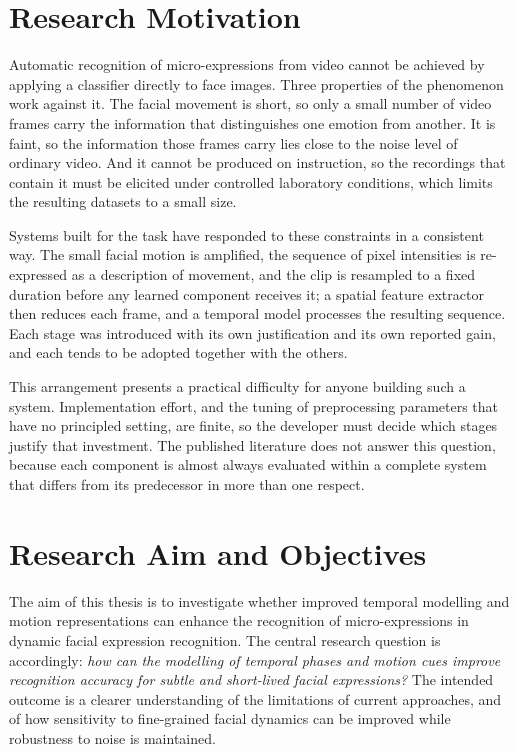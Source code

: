 \section{Research Motivation}
\label{sec:motivation}

Automatic recognition of micro-expressions from video cannot be achieved by applying a classifier directly to face images. Three properties of the phenomenon work against it. The facial movement is short, so only a small number of video frames carry the information that distinguishes one emotion from another. It is faint, so the information those frames carry lies close to the noise level of ordinary video. And it cannot be produced on instruction, so the recordings that contain it must be elicited under controlled laboratory conditions, which limits the resulting datasets to a small size.

Systems built for the task have responded to these constraints in a consistent way. The small facial motion is amplified, the sequence of pixel intensities is re-expressed as a description of movement, and the clip is resampled to a fixed duration before any learned component receives it; a spatial feature extractor then reduces each frame, and a temporal model processes the resulting sequence. Each stage was introduced with its own justification and its own reported gain, and each tends to be adopted together with the others.

This arrangement presents a practical difficulty for anyone building such a system. Implementation effort, and the tuning of preprocessing parameters that have no principled setting, are finite, so the developer must decide which stages justify that investment. The published literature does not answer this question, because each component is almost always evaluated within a complete system that differs from its predecessor in more than one respect.


\section{Research Aim and Objectives}
\label{sec:objectives}

The aim of this thesis is to investigate whether improved temporal modelling and motion representations can enhance the recognition of micro-expressions in dynamic facial expression recognition. The central research question is accordingly: \textit{how can the modelling of temporal phases and motion cues improve recognition accuracy for subtle and short-lived facial expressions?} The intended outcome is a clearer understanding of the limitations of current approaches, and of how sensitivity to fine-grained facial dynamics can be improved while robustness to noise is maintained.

